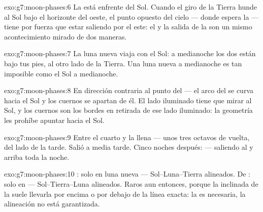 \begin{solution}{exo:g7:moon-phases:6}
La  está enfrente del Sol. Cuando el giro de la Tierra
hunde al Sol bajo el horizonte del oeste, el punto opuesto del cielo
--- donde espera la  --- tiene por fuerza que estar saliendo
por el este: el  y la salida de la  son un mismo
acontecimiento mirado de dos maneras.
\end{solution}

\begin{solution}{exo:g7:moon-phases:7}
La luna nueva viaja con el Sol: a medianoche los dos están bajo tus
pies, al otro lado de la Tierra. Una luna nueva a medianoche es tan
imposible como el Sol a medianoche.
\end{solution}

\begin{solution}{exo:g7:moon-phases:8}
En dirección contraria al punto del  --- el arco del
 se curva hacia el Sol y los cuernos se apartan de él. El
lado iluminado tiene que mirar al Sol, y los cuernos son los bordes en
retirada de ese lado iluminado: la geometría les prohíbe apuntar hacia
el Sol.
\end{solution}

\begin{solution}{exo:g7:moon-phases:9}
Entre el cuarto  y la llena --- unos tres octavos de vuelta,
del lado de la tarde. Salió a media tarde. Cinco noches después:
 --- saliendo al  y arriba toda la noche.
\end{solution}

\begin{solution}{exo:g7:moon-phases:10}
: solo en luna nueva --- Sol--Luna--Tierra alineados.
De : solo en  --- Sol--Tierra--Luna alineados. Raros aun
entonces, porque la  inclinada de la  suele llevarla por
encima o por debajo de la línea exacta: la  es necesaria, la
alineación no está garantizada.
\end{solution}


